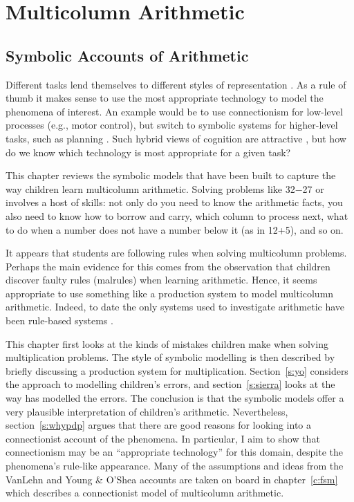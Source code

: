 

\part[Multicolumn arithmetic]{Multicolumn Arithmetic}\label{c:mult}

\newcommand{\anarrow}{\(\Rightarrow\)}

\chapter[Symbolic accounts of arithmetic]{Symbolic Accounts of Arithmetic}
\label{c:bugs}

Different tasks lend themselves to different styles of representation
\cite{slomwhy}.  As a rule of thumb it makes sense to
use the most appropriate technology to model the phenomena of
interest. An example would be to use connectionism for low-level
processes (e.g., motor control), but switch to symbolic systems for
higher-level tasks, such as planning \cite{micro}.  Such hybrid views of
cognition are attractive \cite{thorstir,thorhybr,roseappr,hendneed}, but
how do we know which technology is most appropriate for a given task?

This chapter reviews the symbolic models that have been built to capture
the way children learn multicolumn arithmetic.  Solving problems
like 32$-$27 or  involves a host of skills: not only do you
need to know the arithmetic facts, you also need to know how to
borrow and carry, which column to process next,
what to do when a number does not have a number below it
(as in 12+5), and so on.

It appears that students are following rules when solving multicolumn
problems.  Perhaps the main evidence for this comes from the observation
that children discover faulty rules (malrules) when learning arithmetic.
Hence, it seems appropriate to use something like a production system to
model multicolumn arithmetic. Indeed, to date the only systems
used to investigate arithmetic have been rule-based systems
\cite{buggy,younerro,repair,vanlfeli,mindbugs}.

This chapter first looks at the kinds of mistakes children make when
solving multiplication problems.  The style of symbolic modelling is
then described by briefly discussing a production system for
multiplication.  Section~\ref{s:yo} considers the 
approach to modelling children's errors, and
section~\ref{s:sierra} looks at the way  has modelled
the errors.   The conclusion is that the symbolic models offer a very
plausible interpretation of children's arithmetic.  Nevertheless,
section~\ref{s:whypdp} argues that there are good reasons for looking
into a connectionist account of the phenomena.  In particular, I aim to
show that connectionism may be an ``appropriate technology'' for this
domain, despite the phenomena's rule-like appearance.
Many of the assumptions
and ideas from the VanLehn and Young \& O'Shea accounts are taken on
board in chapter~\ref{c:fsm} which describes a connectionist model of
multicolumn arithmetic.

